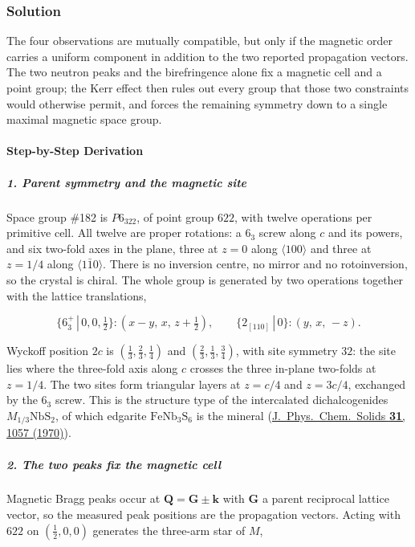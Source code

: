 \subsubsection*{Solution}
The four observations are mutually compatible, but only if the magnetic order carries a uniform component in addition to the two reported propagation vectors. The two neutron peaks and the birefringence alone fix a magnetic cell and a point group; the Kerr effect then rules out every group that those two constraints would otherwise permit, and forces the remaining symmetry down to a single maximal magnetic space group.

\paragraph*{Step-by-Step Derivation}

\subparagraph*{1. Parent symmetry and the magnetic site}

Space group \#182 is $P6_322$, of point group $622$, with twelve operations per primitive cell. All twelve are proper rotations: a $6_3$ screw along $c$ and its powers, and six two-fold axes in the plane, three at $z=0$ along $\langle 100\rangle$ and three at $z=1/4$ along $\langle 1\bar{1}0\rangle$. There is no inversion centre, no mirror and no rotoinversion, so the crystal is chiral. The whole group is generated by two operations together with the lattice translations,

\[
\{6_3^{+}\,|\,0,0,\tfrac12\}:(x-y,\,x,\,z+\tfrac12), \qquad \{2_{[110]}\,|\,0\}:(y,\,x,\,-z).
\]

Wyckoff position $2c$ is $(\tfrac13,\tfrac23,\tfrac14)$ and $(\tfrac23,\tfrac13,\tfrac34)$, with site symmetry $32$: the site lies where the three-fold axis along $c$ crosses the three in-plane two-folds at $z=1/4$. The two sites form triangular layers at $z=c/4$ and $z=3c/4$, exchanged by the $6_3$ screw. This is the structure type of the intercalated dichalcogenides $M_{1/3}\mathrm{NbS}_2$, of which edgarite $\mathrm{FeNb_3S_6}$ is the mineral (\href{\detokenize{https://doi.org/10.1016/0022-3697(70)90315-X}}{J.\ Phys.\ Chem.\ Solids \textbf{31}, 1057 (1970)}).

\subparagraph*{2. The two peaks fix the magnetic cell}

Magnetic Bragg peaks occur at $\mathbf{Q}=\mathbf{G}\pm\mathbf{k}$ with $\mathbf{G}$ a parent reciprocal lattice vector, so the measured peak positions are the propagation vectors. Acting with $622$ on $(\tfrac12,0,0)$ generates the three-arm star of $M$,

